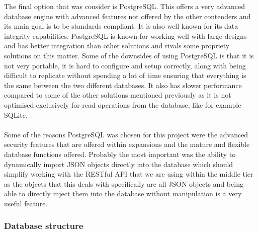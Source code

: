 The final option that was consider is PostgreSQL. This offers a very advanced database engine with advanced features not offered by the other contenders and its main goal is to be standards compliant. It is also well known for its data integrity capabilities. PostgreSQL is known for working well with large designs and has better integration than other solutions and rivals some propriety solutions on this matter. Some of the downsides of using PostgreSQL is that it is not very portable, it is hard to configure and setup correctly, along with being difficult to replicate without spending a lot of time ensuring that everything is the same between the two different databases. It also has slower performance compared to some of the other solutions mentioned previously as it is not optimised exclusively for read operations from the database, like for example SQLite.\\
\\
Some of the reasons PostgreSQL was chosen for this project were the advanced security features that are offered within expansions and the mature and flexible database functions offered. Probably the most important was the ability to dynamically import JSON objects directly into the database which should simplify working with the RESTful API that we are using within the middle tier as the objects that this deals with specifically are all JSON objects and being able to directly inject them into the database without manipulation is a very useful feature. 

\subsubsection{Database structure}
\label{sec:database_strucutre}

